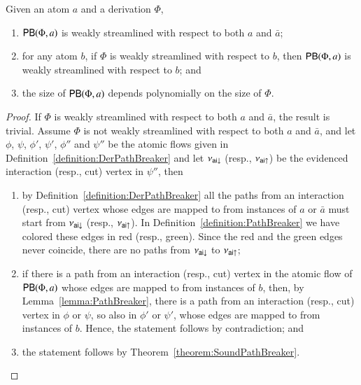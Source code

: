 \begin{proposition}\label{proposition:PathBreaker}
Given an atom $a$ and a derivation $\Phi$,
\begin{enumerate}
\item $\mathsf{PB}(\Phi,a)$ is weakly streamlined with respect to both $a$ and $\bar a$;
\item for any atom $b$, if $\Phi$ is weakly streamlined with respect to $b$, then $\mathsf{PB}(\Phi,a)$ is weakly streamlined with respect to $b$; and
\item the size of\/ $\mathsf{PB}(\Phi,a)$ depends polynomially on the size of\/ $\Phi$.
\end{enumerate}
\end{proposition}

\begin{proof}
If $\Phi$ is weakly streamlined with respect to both $a$ and $\bar a$, the result is trivial. Assume $\Phi$ is not weakly streamlined with respect to both $a$ and $\bar a$, and let $\phi$, $\psi$, $\phi'$, $\psi'$, $\phi''$ and $\psi''$ be the atomic flows given in Definition~\ref{definition:DerPathBreaker} and let $\nu_{{\mathsf{ai}}{\downarrow}}$ (resp., $\nu_{{\mathsf{ai}}{\uparrow}}$) be the evidenced interaction (resp., cut) vertex in $\psi''$, then
\begin{enumerate}
\item by Definition~\ref{definition:DerPathBreaker} all the paths from an interaction (resp., cut) vertex whose edges are mapped to from instances of $a$ or $\bar a$ must start from $\nu_{{\mathsf{ai}}{\downarrow}}$ (resp., $\nu_{{\mathsf{ai}}{\uparrow}}$). In Definition~\ref{definition:PathBreaker} we have colored these edges in red (resp., green). Since the red and the green edges never coincide, there are no paths from $\nu_{{\mathsf{ai}}{\downarrow}}$ to $\nu_{{\mathsf{ai}}{\uparrow}}$;
\item if there is a path from an interaction (resp., cut) vertex in the atomic flow of $\mathsf{PB}(\Phi,a)$ whose edges are mapped to from instances of $b$, then, by Lemma~\vref{lemma:PathBreaker}, there is a path from an interaction (resp., cut) vertex in $\phi$ or $\psi$, so also in $\phi'$ or $\psi'$, whose edges are mapped to from instances of $b$. Hence, the statement follows by contradiction; and
\item the statement follows by Theorem~\vref{theorem:SoundPathBreaker}.
\end{enumerate}
\end{proof}

